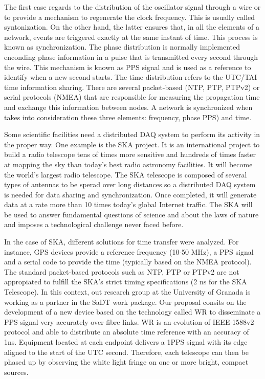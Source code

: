 The first case regards to the distribution of the oscillator signal through a wire or to provide a mechanism to regenerate the clock frequency. This is usually  called syntonization. On the other hand, the latter ensures that, in all the elements of a network, events are triggered exactly at the same instant of time. This process is known as synchronization.
The phase distribution is normally implemented enconding phase information in a pulse that is transmitted every second through the wire. This mechanism is known as PPS signal and is used as a reference to identify when a new second starts.
The time distribution refers to the UTC/TAI time information sharing. There are several packet-based (NTP, PTP, PTPv2) or serial protocols (NMEA) that are responsible for measuring the propagation time and exchange this information between nodes. 
A network is synchronized when takes into consideration these three elements: frequency, phase PPS) and time.

Some scientific facilities need a distributed DAQ system to perform its activity in the proper way. One example is the SKA \cite{ska:project_website} project. It is an international project to build a radio telescope tens of times more sensitive and hundreds of times faster at mapping the sky than today's best radio astronomy facilities. It will become the world's largest radio telescope. The SKA telescope is composed of several types of antennas to be sperad over long distances so a distributed DAQ system is needed for data sharing and synchronization. Once completed, it will generate data at a rate more than 10 times today’s global Internet traffic. The SKA will be used to answer fundamental questions of science and about the laws of nature and imposes a technological challenge never faced before.

In the case of SKA, different solutions for time transfer were analyzed. For instance, GPS devices provide a reference frequency (10-50 MHz), a PPS signal and a serial code to provide the time (typically based on the NMEA protocol). The standard packet-based protocols such as NTP, PTP or PTPv2 are not appropiated to fulfill the SKA's strict timing specifications (2 ns for the SKA Telescope).
In this context, out research group at the University of Granada is working as a partner in the SaDT \cite{ska:sadt_website} work package. Our proposal consits on the development of a new device based on the technology called WR \cite{ohwr:wr_wiki} to disseminate a PPS signal very accurately over fibre links. WR is an evolution of IEEE-1588v2 protocol and able to distribute an absolute time reference with an accuracy of 1ns. Equipment located at each endpoint delivers a 1PPS signal with its edge aligned to the start of the UTC second. Therefore, each telescope can then be phased up by observing the white light fringe on one or more bright, compact sources.

